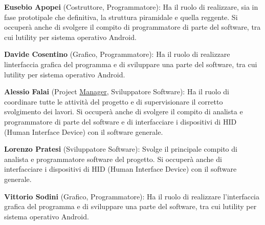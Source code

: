 \begin{DoxyItemize}
\item {\bfseries Eusebio Apopei} (Costruttore, Programmatore)\+: Ha il ruolo di realizzare, sia in fase prototipale che definitiva, la struttura piramidale e quella reggente. Si occuperà anche di svolgere il compito di programmatore di parte del software, tra cui l\textquotesingle{}utility per sistema operativo Android.
\item {\bfseries Davide Cosentino} (Grafico, Programmatore)\+: Ha il ruolo di realizzare l\textquotesingle{}interfaccia grafica del programma e di sviluppare una parte del software, tra cui l\textquotesingle{}utility per sistema operativo Android.
\item {\bfseries Alessio Falai} (Project \hyperlink{classManager}{Manager}, Sviluppatore Software)\+: Ha il ruolo di coordinare tutte le attività del progetto e di supervisionare il corretto svolgimento dei lavori. Si occuperà anche di svolgere il compito di analista e programmatore di parte del software e di interfacciare i dispositivi di H\+ID (Human Interface Device) con il software generale.
\item {\bfseries Lorenzo Pratesi} (Sviluppatore Software)\+: Svolge il principale compito di analista e programmatore software del progetto. Si occuperà anche di interfacciare i dispositivi di H\+ID (Human Interface Device) con il software generale.
\item {\bfseries Vittorio Sodini} (Grafico, Programmatore)\+: Ha il ruolo di realizzare l’interfaccia grafica del programma e di sviluppare una parte del software, tra cui l\textquotesingle{}utility per sistema operativo Android. 
\end{DoxyItemize}